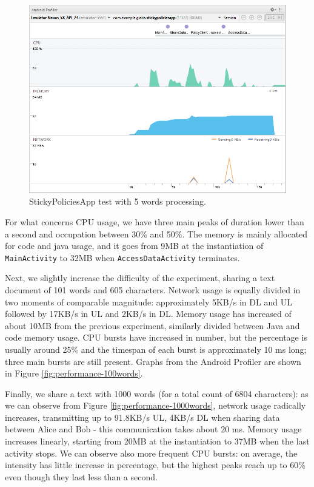 \begin{figure}
	\centering
	\includegraphics[width=0.95\linewidth]{Performance-5words.png}
	\caption{StickyPoliciesApp test with 5 words processing.}
	\label{fig:performance-5words}
\end{figure}

For what concerns CPU usage, we have three main peaks of duration lower than a second and occupation between 30\% and 50\%. The memory is mainly allocated for code and java usage, and it goes from 9MB at the instantiation of \texttt{MainActivity} to 32MB when \texttt{AccessDataActivity} terminates.

Next, we slightly increase the difficulty of the experiment, sharing a text document of 101 words and 605 characters. Network usage is equally divided in two moments of comparable magnitude: approximately 5KB/s in DL and UL followed by 17KB/s in UL and 2KB/s in DL. Memory usage has increased of about 10MB from the previous experiment, similarly divided between Java and code memory usage. CPU bursts have increased in number, but the percentage is usually around 25\% and the timespan of each burst is approximately 10 ms long; three main bursts are still present. Graphs from the Android Profiler are shown in Figure \ref{fig:performance-100words}.

Finally, we share a text with 1000 words (for a total count of 6804 characters): as we can observe from Figure \ref{fig:performance-1000words}, network usage radically increases, transmitting up to 91.8KB/s UL, 4KB/s DL when sharing data between Alice and Bob - this communication takes about 20 ms. Memory usage increases linearly, starting from 20MB at the instantiation to 37MB when the last activity stops. We can observe also more frequent CPU bursts: on average, the intensity has little increase in percentage, but the highest peaks reach up to 60\% even though they last less than a second.

